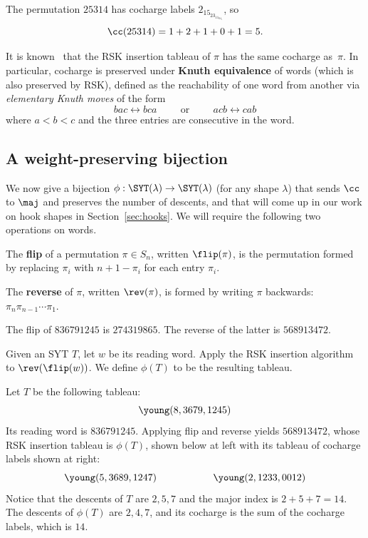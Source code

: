 \begin{example}
	The permutation $25314$ has cocharge labels $2_15_23_11_04_1$, so $$\cc(25314)=1+2+1+0+1=5.$$
	
\end{example}


It is known~\cite{LascouxSchutzenberger} that the RSK insertion tableau of $\pi$ has the same cocharge as~$\pi$.  In particular, cocharge is preserved under \textbf{Knuth equivalence} of words (which is also preserved by RSK), defined as the reachability of one word from another via \textit{elementary Knuth moves} of the form $$bac \leftrightarrow bca \hspace{1cm} \text{or} \hspace{1cm} acb\leftrightarrow cab$$
where $a< b< c$ and the three entries are consecutive in the word.

\subsection{A weight-preserving bijection}

We now give a bijection $\phi:\SYT(\lambda)\to \SYT(\lambda)$ (for any shape $\lambda$) that sends $\cc$ to $\maj$ and preserves the number of descents, and that will come up in our work on hook shapes in Section~\ref{sec:hooks}.  We will require the following two operations on words.

\begin{definition}
	The \textbf{flip} of a permutation $\pi\in S_n$, written $\flip(\pi)$, is the permutation formed by replacing $\pi_i$ with $n+1-\pi_i$ for each entry $\pi_i$.
	
	The \textbf{reverse} of $\pi$, written $\rev(\pi)$, is formed by writing $\pi$ backwards: $\pi_n\pi_{n-1}\cdots \pi_1$.
\end{definition}

\begin{example}
	The flip of $836791245$ is $274319865$.  The reverse of the latter is $568913472$.
\end{example}

\begin{definition}
	Given an SYT $T$, let $w$ be its reading word.  Apply the RSK insertion algorithm to $\rev(\flip(w))$.  We define $\phi(T)$ to be the resulting tableau.
\end{definition}

\begin{example}
	Let $T$ be the following tableau: $$\young(8,3679,1245)$$ Its reading word is $836791245$.  Applying flip and reverse yields $568913472$, whose RSK insertion tableau is $\phi(T)$, shown below at left with its tableau of cocharge labels shown at right:
	$$\young(5,3689,1247) \hspace{2cm} \young(2,1233,0012)$$
	Notice that the descents of $T$ are $2,5,7$ and the major index is $2+5+7=14$.  The descents of $\phi(T)$ are $2,4,7$, and its cocharge is the sum of the cocharge labels, which is $14$.
\end{example}


